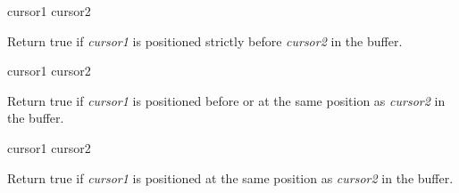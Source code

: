  {cursor1 cursor2}

Return true if \textit{cursor1} is positioned strictly before
\textit{cursor2} in the buffer.

\ifdetachedmany{}

 {cursor1 cursor2}

Return true if \textit{cursor1} is positioned before or at the same
position as \textit{cursor2} in the buffer.

\ifdetachedmany{}

 {cursor1 cursor2}

Return true if \textit{cursor1} is positioned at the same position as
\textit{cursor2} in the buffer.

\ifdetachedmany{}